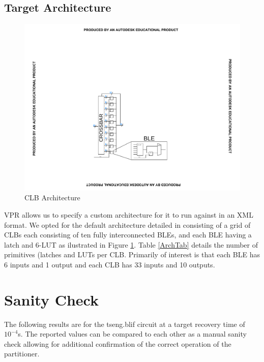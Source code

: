 \documentclass[12pt,final,oneside]{dwThesis} %
\begin{document}
   \subsection{Target Architecture}
   \begin{figure}
      \begin{center}
         \includegraphics[clip,trim=8cm 4cm 8cm 8cm]{images/CLB.pdf}
         \caption{\ac{CLB} Architecture}
         \label{ArchFig}
      \end{center}
   \end{figure}
   \ac{VPR} allows us to specify a custom architecture for it to run against in an XML format. We opted for the default architecture detailed in \cite{VPRManual} consisting of a grid of \acp{CLB} each consisting of ten fully interconnected \acp{BLE}, and each \ac{BLE} having a latch and 6-\ac{LUT} as ilustrated in Figure \ref{ArchFig}.
   Table \ref{ArchTab} details the number of primitives (latches and \acp{LUT} per \ac{CLB}. Primarily of interest is that each \ac{BLE} has 6 inputs and 1 output and each \ac{CLB} has 33 inputs and 10 outputs.




   \section{Sanity Check}\label{resSanity}
   The following results are for the tseng.blif circuit at a target recovery time of $10^{-4}$s. The reported values can be compared to each other as a manual sanity check allowing for additional confirmation of the correct operation of the partitioner.
   
\end{document}
